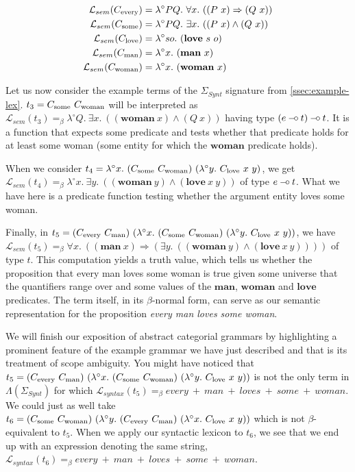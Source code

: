 \begin{align*}
\mathcal{L}_{sem}(\synt{every}) &= \lambda^{\circ} P Q.\ \forall x.\ ((P\ x) \Rightarrow (Q\ x)) \\
\mathcal{L}_{sem}(\synt{some}) &= \lambda^{\circ} P Q.\ \exists x.\ ((P\ x) \land (Q\ x)) \\
\mathcal{L}_{sem}(\synt{love}) &= \lambda^{\circ} so.\ (\textbf{love}\ s\ o) \\
\mathcal{L}_{sem}(\synt{man}) &= \lambda^{\circ} x.\ (\textbf{man}\ x) \\
\mathcal{L}_{sem}(\synt{woman}) &= \lambda^{\circ} x.\ (\textbf{woman}\ x)
\end{align*}

Let us now consider the example terms of the $\Sigma_{Synt}$ signature
from \ref{ssec:example-lex}. $t_3 = C_{\textrm{some}}\ C_{\textrm{woman}}$ will be
interpreted as $\mathcal{L}_{sem}(t_3) =_{\beta} \lambda^{\circ}
Q.\ \exists x.\ ((\textbf{woman}\ x) \land (Q\ x))$ having type $(e
\mathbin{{-}\mkern-3.5mu{\circ}} t) \mathbin{{-}\mkern-3.5mu{\circ}} t$. It is a function that expects some predicate and
tests whether that predicate holds for at least some woman (some entity
for which the $\textbf{woman}$ predicate holds).

When we consider $t_4 = \lambda^{\circ}
x.\ (C_{\textrm{some}}\ C_{\textrm{woman}})\ (\lambda^{\circ}
y.\ C_{\textrm{love}}\ x\ y)$, we get $\mathcal{L}_{sem}(t_4) =_{\beta}
\lambda^{\circ} x.\ \exists y.\ ((\textbf{woman}\ y) \land
(\textbf{love}\ x\ y))$ of type $e \mathbin{{-}\mkern-3.5mu{\circ}} t$. What we have here is a
predicate function testing whether the argument entity loves some woman.

Finally, in $t_5 = (\synt{every}\ \synt{man})\ (\lambda^{\circ}
x.\ (\synt{some}\ \synt{woman})\ (\lambda^{\circ}
y.\ \synt{love}\ x\ y))$, we have $\mathcal{L}_{sem}(t_5) =_{\beta}
\forall x.\ ((\textbf{man}\ x) \Rightarrow (\exists
y.\ ((\textbf{woman}\ y) \land (\textbf{love}\ x\ y))))$ of type
$t$. This computation yields a truth value, which tells us whether the
proposition that every man loves some woman is true given some universe
that the quantifiers range over and some values of the $\textbf{man}$,
$\textbf{woman}$ and $\textbf{love}$ predicates. The term itself, in its
$\beta$-normal form, can serve as our semantic representation for the
proposition \emph{every man loves some woman}.

We will finish our exposition of abstract categorial grammars by
highlighting a prominent feature of the example grammar we have just
described and that is its treatment of scope ambiguity. You might have
noticed that $t_5 = (\synt{every}\ \synt{man})\ (\lambda^{\circ}
x.\ (\synt{some}\ \synt{woman})\ (\lambda^{\circ}
y.\ \synt{love}\ x\ y))$ is not the only term in
$\Lambda(\Sigma_{Synt})$ for which $\mathcal{L}_{syntax}(t_5) =_{\beta}
every\ +\ man\ +\ loves\ +\ some\ +\ woman$. We could just as well take
$t_6 = (C_{\textrm{some}}\ C_{\textrm{woman}})\ (\lambda^{\circ}
y.\ (C_{\textrm{every}}\ C_{\textrm{man}})\ (\lambda^{\circ}
x.\ C_{\textrm{love}}\ x\ y))$ which is not $\beta$-equivalent to $t_5$. When
we apply our syntactic lexicon to $t_6$, we see that we end up with an
expression denoting the same string, $\mathcal{L}_{syntax}(t_6)
=_{\beta} every\ +\ man\ +\ loves\ +\ some\ +\ woman$.

